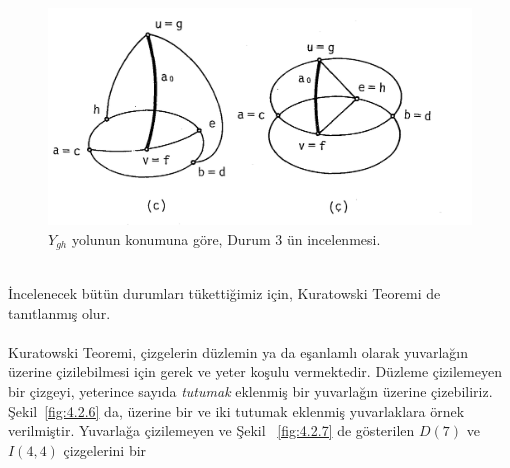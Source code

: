 \documentclass[11pt]{amsbook}
\begin{document}
\begin{figure}[htb]
	\centering
	

	\includegraphics[keepaspectratio=true,scale=0.35]{images/ceyhun-202-fig01}
	\caption{$Y_{gh}$ yolunun konumuna göre, Durum 3 ün incelenmesi.}
	\label{fig:4.2.5}
	
\end{figure}
\\
İncelenecek bütün durumları tükettiğimiz için, 
Kuratowski Teoremi de tanıtlanmış olur.
\\
\\Kuratowski Teoremi, çizgelerin düzlemin ya da
eşanlamlı olarak yuvarlağın üzerine çizilebilmesi
için gerek ve yeter koşulu vermektedir. Düzleme 
çizilemeyen bir çizgeyi, yeterince sayıda
\textit{tutumak} eklenmiş bir yuvarlağın üzerine
çizebiliriz. Şekil~\ref{fig:4.2.6} da, üzerine bir ve iki
tutumak eklenmiş yuvarlaklara örnek verilmiştir.
Yuvarlağa çizilemeyen ve Şekil ~\ref{fig:4.2.7} de
gösterilen $D(7)$ ve $I(4,4)$ çizgelerini bir
\end{document}
